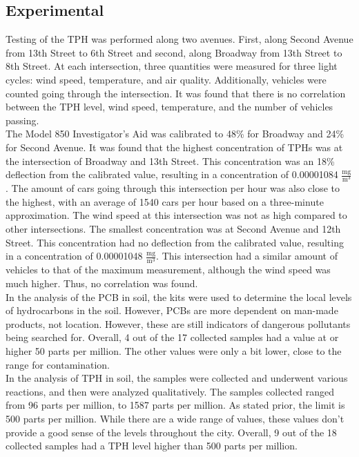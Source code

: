 \documentclass{article}
\begin{document}
    \subsection{Experimental}
    \indent Testing of the TPH was performed along two avenues. First, along Second Avenue from 13th Street to 6th Street and second, along Broadway from 13th Street to 8th Street. At each intersection, three quantities were measured for three light cycles: wind speed, temperature, and air quality. Additionally, vehicles were counted going through the intersection. It was found that there is no correlation between the TPH level, wind speed, temperature, and the number of vehicles passing. \\
    \indent The Model 850 Investigator's Aid was calibrated to 48\% for Broadway and 24\% for Second Avenue. It was found that the highest concentration of TPHs was at the intersection of Broadway and 13th Street. This concentration was an 18\% deflection from the calibrated value, resulting in a concentration of 0.00001084 \(\frac{\text{mg}}{\text{m}^3}\). The amount of cars going through this intersection per hour was also close to the highest, with an average of 1540 cars per hour based on a three-minute approximation. The wind speed at this intersection was not as high compared to other intersections. The smallest concentration was at Second Avenue and 12th Street. This concentration had no deflection from the calibrated value, resulting in a concentration of 0.00001048 \(\frac{\text{mg}}{\text{m}^3}\). This intersection had a similar amount of vehicles to that of the maximum measurement, although the wind speed was much higher. Thus, no correlation was found.\\
    \indent In the analysis of the PCB in soil, the kits were used to determine the local levels of hydrocarbons in the soil. However, PCBs are more dependent on man-made products, not location. However, these are still indicators of dangerous pollutants being searched for. Overall, 4 out of the 17 collected samples had a value at or higher 50 parts per million. The other values were only a bit lower, close to the range for contamination.\\ 
    \indent In the analysis of TPH in soil, the samples were collected and underwent various reactions, and then were analyzed qualitatively. The samples collected ranged from 96 parts per million, to 1587 parts per million. As stated prior, the limit is 500 parts per million. While there are a wide range of values, these values don't provide a good sense of the levels throughout the city. Overall, 9 out of the 18 collected samples had a TPH level higher than 500 parts per million. \\
    \newpage
\end{document}
